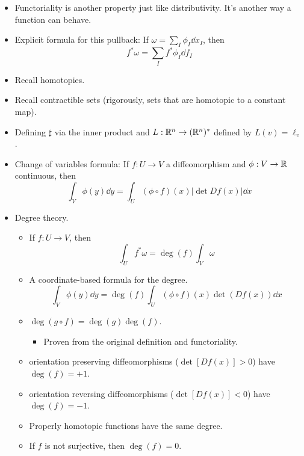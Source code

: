 \documentclass[../notes.tex]{subfiles}
\begin{document}
\begin{itemize}
\begin{enumerate}
    \end{enumerate}
    \item Functoriality is another property just like distributivity. It's another way a function can behave.
    \item Explicit formula for this pullback: If $\omega=\sum_I\phi_I\dd{x_I}$, then
    \begin{equation*}
        f^*\omega = \sum_If^*\phi_I\dd f_I
    \end{equation*}
    \item Recall homotopies.
    \item Recall contractible sets (rigorously, sets that are homotopic to a constant map).
    \item Defining $\sharp$ via the inner product and $L:\mathbb{R}^n\to(\mathbb{R}^n)^*$ defined by $L(v)=\ell_v$.
    \item Change of variables formula: If $f:U\to V$ a diffeomorphism and $\phi:V\to\mathbb{R}$ continuous, then
    \begin{equation*}
        \int_V\phi(y)\dd{y} = \int_U(\phi\circ f)(x)|\det Df(x)|\dd{x}
    \end{equation*}
    \item Degree theory.
    \begin{itemize}
        \item If $f:U\to V$, then
        \begin{equation*}
            \int_Uf^*\omega = \deg(f)\int_V\omega
        \end{equation*}
        \item A coordinate-based formula for the degree.
        \begin{equation*}
            \int_V\phi(y)\dd{y} = \deg(f)\int_U(\phi\circ f)(x)\det(Df(x))\dd{x}
        \end{equation*}
        \item $\deg(g\circ f)=\deg(g)\deg(f)$.
        \begin{itemize}
            \item Proven from the original definition and functoriality.
        \end{itemize}
        \item orientation preserving diffeomorphisms ($\det[Df(x)]>0$) have $\deg(f)=+1$.
        \item orientation reversing diffeomorphisms ($\det[Df(x)]<0$) have $\deg(f)=-1$.
        \item Properly homotopic functions have the same degree.
        \item If $f$ is not surjective, then $\deg(f)=0$.

\end{itemize}
\end{itemize}
\end{document}
